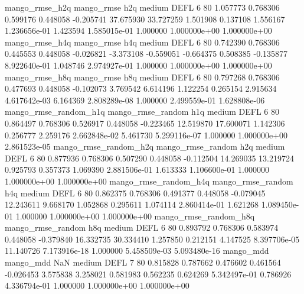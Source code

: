        mango_rmse_h2q        mango_rmse                  h2q     medium     DEFL                 6 80  1.057773       0.768306 0.599176       0.448058   -0.205741     37.675930     33.727259     1.501908       0.137108  1.556167 1.236656e-01     1.423594   1.585015e-01            1.000000    1.000000e+00        1.000000e+00
       mango_rmse_h4q        mango_rmse                  h4q     medium     DEFL                 6 80  0.742390       0.768306 0.445553       0.448058   -0.026821     -3.373108     -0.559051    -0.664375       0.508385 -0.135877 8.922640e-01     1.048746   2.974927e-01            1.000000    1.000000e+00        1.000000e+00
       mango_rmse_h8q        mango_rmse                  h8q     medium     DEFL                 6 80  0.797268       0.768306 0.477693       0.448058   -0.102073      3.769542      6.614196     1.122254       0.265154  2.915634 4.617642e-03     6.164369   2.808289e-08            1.000000    2.499559e-01        1.628808e-06
mango_rmse_random_h1q mango_rmse_random                  h1q     medium     DEFL                 6 80  0.864497       0.768306 0.526917       0.448058   -0.223465     12.519870     17.600071     1.142306       0.256777  2.259176 2.662848e-02     5.461730   5.299116e-07            1.000000    1.000000e+00        2.861523e-05
mango_rmse_random_h2q mango_rmse_random                  h2q     medium     DEFL                 6 80  0.877936       0.768306 0.507290       0.448058   -0.112504     14.269035     13.219724     0.925793       0.357373  1.069390 2.881506e-01     1.613333   1.106600e-01            1.000000    1.000000e+00        1.000000e+00
mango_rmse_random_h4q mango_rmse_random                  h4q     medium     DEFL                 6 80  0.862375       0.768306 0.491377       0.448058   -0.079045     12.243611      9.668170     1.052868       0.295611  1.074114 2.860414e-01     1.621268   1.089450e-01            1.000000    1.000000e+00        1.000000e+00
mango_rmse_random_h8q mango_rmse_random                  h8q     medium     DEFL                 6 80  0.893792       0.768306 0.583974       0.448058   -0.379840     16.332735     30.334410     1.257850       0.212151  4.147525 8.397706e-05    11.140726   7.173916e-18            1.000000    5.458509e-03        5.093480e-16
            mango_mdd         mango_mdd                  NaN     medium     DEFL                 7 80  0.815828       0.787662 0.476602       0.461564   -0.026453      3.575838      3.258021     0.581983       0.562235  0.624269 5.342497e-01     0.786926   4.336794e-01            1.000000    1.000000e+00        1.000000e+00
